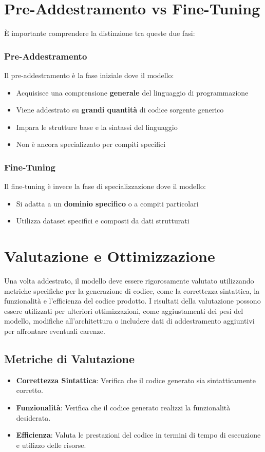 \documentclass[12pt,a4paper,openright,twoside]{book}
\begin{document}
\section{Pre-Addestramento vs Fine-Tuning}
È importante comprendere la distinzione tra queste due fasi:
\subsubsection{Pre-Addestramento}
Il pre-addestramento è la fase iniziale dove il modello:
\begin{itemize}
    \item Acquisisce una comprensione \textbf{generale} del linguaggio di programmazione
    \item Viene addestrato su \textbf{grandi quantità} di codice sorgente generico
    \item Impara le strutture base e la sintassi del linguaggio
    \item Non è ancora specializzato per compiti specifici
\end{itemize}

\subsubsection{Fine-Tuning}
Il fine-tuning è invece la fase di specializzazione dove il modello:
\begin{itemize}
    \item Si adatta a un \textbf{dominio specifico} o a compiti particolari
    \item Utilizza dataset specifici e composti da dati strutturati 
\end{itemize}

\section{Valutazione e Ottimizzazione}
Una volta addestrato, il modello deve essere rigorosamente valutato utilizzando metriche specifiche per la generazione di codice, come la correttezza sintattica, la funzionalità e l'efficienza del codice prodotto.
I risultati della valutazione possono essere utilizzati per ulteriori ottimizzazioni, come aggiustamenti dei pesi del modello, modifiche all'architettura o includere dati di addestramento aggiuntivi per affrontare eventuali carenze.

\subsection{Metriche di Valutazione}
\begin{itemize}
    \item \textbf{Correttezza Sintattica}: Verifica che il codice generato sia sintatticamente corretto.
    \item \textbf{Funzionalità}: Verifica che il codice generato realizzi la funzionalità desiderata.
    \item \textbf{Efficienza}: Valuta le prestazioni del codice in termini di tempo di esecuzione e utilizzo delle risorse.
\end{itemize}
\end{document}
